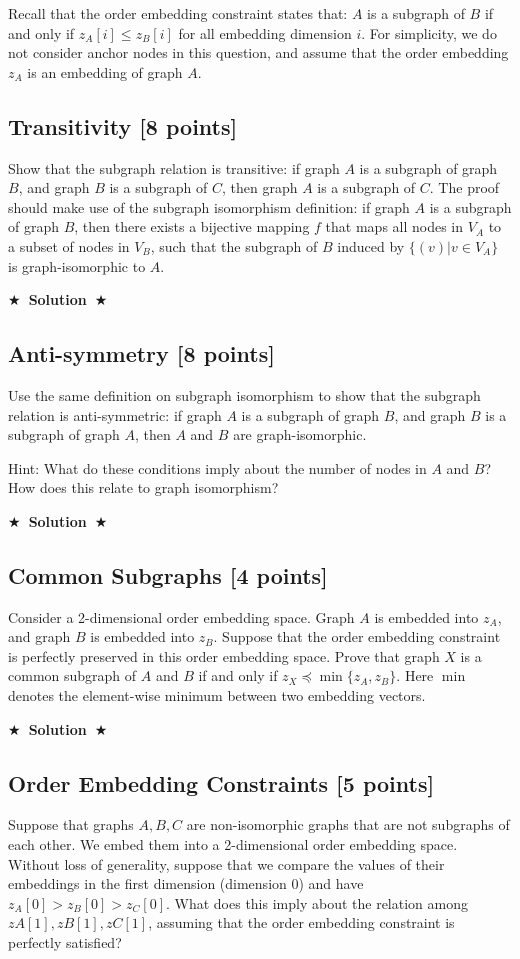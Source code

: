 \documentclass{article}
\newcommand{\Solution}[1]{{\medskip \color{black} \bf $\bigstar$~\sf \textbf{Solution}~$\bigstar$ \sf #1 } \bigskip}
\begin{document}
Recall that the order embedding constraint states that: $A$ is a subgraph of $B$ if and only if $z_A[i] \leq z_B[i]$ for all embedding dimension $i$. For simplicity, we do not consider anchor nodes in this question, and assume that the order embedding $z_A$ is an embedding of graph $A$.

\subsection{Transitivity [8 points]}
Show that the subgraph relation is transitive: if graph $A$ is a subgraph of graph $B$, and graph $B$ is a subgraph of $C$, then graph $A$ is a subgraph of $C$. The proof should make use of the subgraph isomorphism definition: if graph $A$ is a subgraph of graph $B$, then there exists a bijective mapping $f$ that maps all nodes in $V_A$ to a subset of nodes in $V_B$, such that the subgraph of $B$ induced by $\{(v)|v \in V_A\}$ is graph-isomorphic to $A$.

\Solution{}

\subsection{Anti-symmetry [8 points]}
Use the same definition on subgraph isomorphism to show that the subgraph relation is anti-symmetric: if graph $A$ is a subgraph of graph $B$, and graph $B$ is a subgraph of graph $A$, then $A$ and $B$ are graph-isomorphic.

Hint: What do these conditions imply about the number of nodes in $A$ and $B$? How does this relate to graph isomorphism?

\Solution{}

\subsection{Common Subgraphs [4 points]}
Consider a 2-dimensional order embedding space. Graph $A$ is embedded into $z_A$, and graph $B$ is embedded into $z_B$. Suppose that the order embedding constraint is perfectly preserved in this order embedding space. Prove that graph $X$ is a common subgraph of $A$ and $B$ if and only if $z_X \preccurlyeq \min\{z_A, z_B\}$. Here $\min$ denotes the element-wise minimum between two embedding vectors.

\Solution{}

\subsection{Order Embedding Constraints [5 points]}
Suppose that graphs $A,B,C$ are non-isomorphic graphs that are not subgraphs of each other. We embed them into a 2-dimensional order embedding space. Without loss of generality, suppose that we compare the values of their embeddings in the first dimension (dimension 0) and have $z_A[0] > z_B[0] > z_C[0]$. What does this imply about the relation among $zA[1],zB[1],zC[1]$, assuming that the order embedding constraint is perfectly satisfied?
\end{document}
